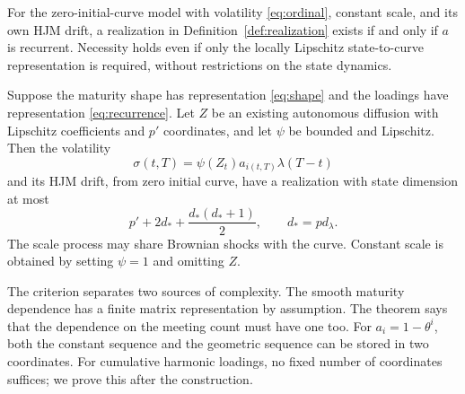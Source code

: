 \begin{theorem}\label{thm:realization}
For the zero-initial-curve model with volatility \eqref{eq:ordinal}, constant scale, and its own HJM drift, a realization in Definition~\ref{def:realization} exists if and only if $a$ is recurrent. Necessity holds even if only the locally Lipschitz state-to-curve representation is required, without restrictions on the state dynamics.

\end{theorem}

\begin{proposition}\label{prop:scaledconstruction}
Suppose the maturity shape has representation \eqref{eq:shape} and the loadings have representation \eqref{eq:recurrence}. Let $Z$ be an existing autonomous diffusion with Lipschitz coefficients and $p'$ coordinates, and let $\psi$ be bounded and Lipschitz. Then the volatility
\[
\sigma(t,T)=\psi(Z_t)a_{i(t,T)}\lambda(T-t)
\]
and its HJM drift, from zero initial curve, have a realization with state dimension at most
\begin{equation}
p'+2d_*+\frac{d_*(d_*+1)}2,\qquad d_*=p d_\lambda.\label{eq:dimension}
\end{equation}
The scale process may share Brownian shocks with the curve. Constant scale is obtained by setting $\psi=1$ and omitting $Z$.
\end{proposition}

The criterion separates two sources of complexity. The smooth maturity dependence has a finite matrix representation by assumption. The theorem says that the dependence on the meeting count must have one too. For $a_i=1-\theta^i$, both the constant sequence and the geometric sequence can be stored in two coordinates. For cumulative harmonic loadings, no fixed number of coordinates suffices; we prove this after the construction.

